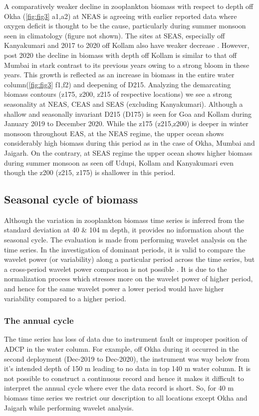 \documentclass{article}
\begin{document}
	A comparatively weaker decline in zooplankton biomass with respect to depth off Okha (\cref{fig:fig3} a1,a2) at NEAS is agreeing with earlier reported data \cite{madhupratap2001mesozooplankton,smith2005mesozooplankton,wishner1998mesozooplankton} where oxygen deficit is thought to be the cause, particularly during summer monsoon seen in \citep{garcia2013oxygen} climatology (figure not shown). The sites at SEAS, especially off Kanyakumari and 2017 to 2020 off Kollam also have weaker decrease \citep{madhupratap2001mesozooplankton, aparna2022seasonal}. However, post 2020 the decline in biomass with depth off Kollam is similar to that off Mumbai in stark contrast to its previous years owing to a strong bloom in these years. This growth is reflected as an increase in biomass in the entire water column(\cref{fig:fig3} f1,f2) and deepening of D215. Analyzing the demarcating biomass contours (z175, z200, z215 of respective locations) we see a strong seasonality at NEAS, CEAS and SEAS (excluding Kanyakumari). Although a shallow and seasonally invariant D215 (D175) is seen for Goa and Kollam  during January 2019 to December 2020. While the z175 (z215,z200) is deeper in winter monsoon throughout EAS, at the NEAS regime, the upper ocean shows considerably high biomass during this period as in the case of Okha, Mumbai and Jaigarh. On the contrary, at SEAS regime the upper ocean shows higher biomass during summer monsoon as seen off Udupi, Kollam and Kanyakumari even though the z200 (z215, z175) is shallower in this period. 
	
	\subsection{Seasonal cycle of biomass}
	\label{sec:seasonalcyclebiomass}
	Although the variation in zooplankton biomass time series is inferred from the standard deviation at 40 \& 104 m depth, it provides no information about the seasonal cycle. The evaluation is made from performing wavelet analysis on the time series. In the investigation of dominant periods, it is valid to compare the wavelet power (or variability) along a particular period across the time series, but a cross-period wavelet power comparison is not possible \citep{maraun2004cross,chaudhuri2020observed}. It is due to the normalization process which stresses more on the wavelet power of higher period, and hence for the same wavelet power a lower period would have higher variability compared to a higher period. 
	\subsubsection{The annual cycle}
	The time series has loss of data due to instrument fault or improper position of ADCP in the water column. For example, off Okha during it occurred in the second deployment (Dec-2019 to Dec-2020), the instrument was way below from it's intended depth of 150 m leading to no data in top 140 m water column. It is not possible to construct a continuous record and hence it makes it difficult to interpret the annual cycle where ever the data record is short. So, for 40 m biomass time series we restrict our description to all locations except Okha and Jaigarh while performing wavelet analysis.
	
\end{document}
